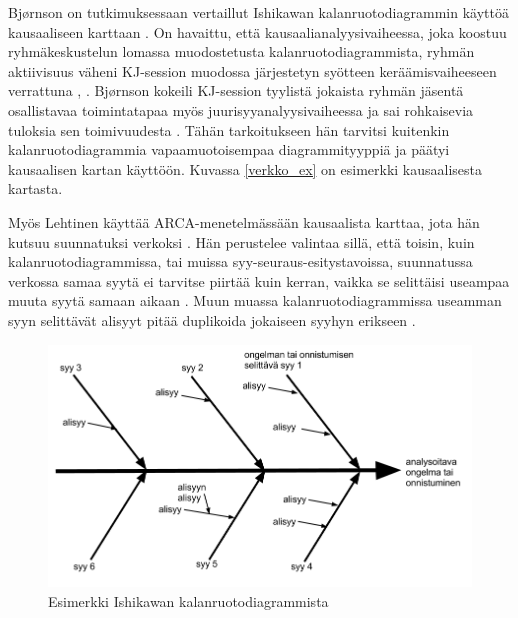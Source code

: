 Bj{\o}rnson on tutkimuksessaan vertaillut Ishikawan kalanruotodiagrammin käyttöä kausaaliseen karttaan \citep{Bjornson2009}. On havaittu, että kausaalianalyysivaiheessa, joka koostuu ryhmäkeskustelun lomassa muodostetusta kalanruotodiagrammista, ryhmän aktiivisuus väheni KJ-session muodossa järjestetyn syötteen keräämisvaiheeseen verrattuna \citep{Bjornson2009}, \citep{staalhane2003post}. Bj{\o}rnson kokeili KJ-session tyylistä jokaista ryhmän jäsentä osallistavaa toimintatapaa myös juurisyyanalyysivaiheessa  ja sai rohkaisevia tuloksia sen toimivuudesta \citep{Bjornson2009}. Tähän tarkoitukseen hän tarvitsi kuitenkin kalanruotodiagrammia vapaamuotoisempaa diagrammityyppiä ja päätyi kausaalisen kartan käyttöön. Kuvassa \ref{verkko_ex} on esimerkki kausaalisesta kartasta.

Myös Lehtinen käyttää ARCA-menetelmässään kausaalista karttaa, jota hän kutsuu suunnatuksi verkoksi \citep{Lehtinen2011}. Hän perustelee valintaa sillä, että toisin, kuin kalanruotodiagrammissa, tai muissa syy-seuraus-esitystavoissa, suunnatussa verkossa samaa syytä ei tarvitse piirtää kuin kerran, vaikka se selittäisi useampaa muuta syytä samaan aikaan \citep{Lehtinen2011}. Muun muassa kalanruotodiagrammissa useamman syyn selittävät alisyyt pitää duplikoida jokaiseen syyhyn erikseen \citep{Lehtinen2011}.

\begin{figure}[ht!]
\centering
\includegraphics[width=150mm]{ishikawa_esimerkki.png}
\caption{Esimerkki Ishikawan kalanruotodiagrammista}
\label{ishikawa_ex}
\end{figure}

